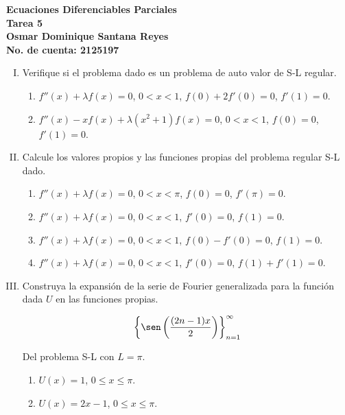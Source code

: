 \documentclass[fleqn]{article}
\begin{document}
	\bfseries
	Ecuaciones Diferenciables Parciales \\
	Tarea 5 \\
	Osmar Dominique Santana Reyes \\
	No. de cuenta: 2125197 \\

	\begin{enumerate}[I.]
		\item Verifique si el problema dado es un problema de auto valor de S-L regular.
		
		\begin{enumerate}
			\item $ f''(x) + \lambda f(x) = 0 $, $ 0 < x < 1 $, $ f(0) + 2 f'(0) = 0 $, $ f'(1) = 0 $.
			\item $ f''(x) - x f(x) + \lambda (x^2 + 1) f(x) = 0 $, $ 0 < x < 1 $, $ f(0) = 0 $, $ f'(1) = 0 $.
		\end{enumerate}

		\item Calcule los valores propios y las funciones propias del problema regular S-L dado.
		
		\begin{enumerate}
			\item $ f''(x) + \lambda f(x) = 0 $, $ 0 < x < \pi $, $ f(0) = 0 $, $ f'(\pi) = 0 $.
			\item $ f''(x) + \lambda f(x) = 0 $, $ 0 < x < 1 $, $ f'(0) = 0 $, $ f(1) = 0 $.
			\item $ f''(x) + \lambda f(x) = 0 $, $ 0 < x < 1 $, $ f(0) - f'(0) = 0 $, $ f(1) = 0 $.
			\item $ f''(x) + \lambda f(x) = 0 $, $ 0 < x < 1 $, $ f'(0) = 0 $, $ f(1) + f'(1) = 0 $.
		\end{enumerate}

		\item Construya la expansión de la serie de Fourier generalizada para la función dada $U$ en las funciones propias.
		
		\begin{equation*}
			\left\lbrace \sen \left( \dfrac{(2n - 1) x}{2} \right) \right\rbrace_{n=1}^{\infty}
		\end{equation*}

		Del problema S-L con $ L = \pi $.
		
		\begin{enumerate}
			\item $ U(x) = 1 $, $ 0 \leq x \leq \pi $.
			\item $ U(x) = 2x - 1 $, $ 0 \leq x \leq \pi $.
		\end{enumerate}


\end{enumerate}
\end{document}
